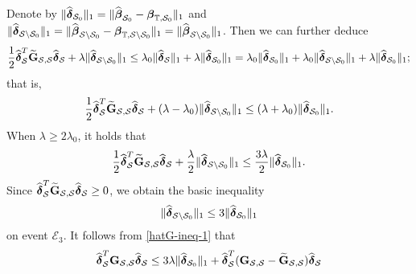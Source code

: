 \documentclass[11pt]{article}
\newcommand{\bG}{\mbox{\bf G}}
\newcommand{\bbeta}{\mbox{\boldmath $\beta$}}
\newcommand{\bdelta}{\mbox{\boldmath $\delta$}}
\begin{document}
Denote by  $\|\widehat{\bdelta}_{\mathcal{S}_0}\|_1=\|\widehat{\bbeta}_{\mathcal{S}_0}-\bbeta_{\mathbb{T}, \mathcal{S}_0}\|_1$ and $\|\widehat{\bdelta}_{\mathcal{S}\setminus\mathcal{S}_0}\|_1=\|\widehat{\bbeta}_{\mathcal{S}\setminus \mathcal{S}_0}-\bbeta_{\mathbb{T}, \mathcal{S}\setminus\mathcal{S}_0}\|_1=\|\widehat{\bbeta}_{\mathcal{S}\setminus\mathcal{S}_0}\|_1$. Then we can further deduce
		\begin{eqnarray*}
			\dfrac{1}{2}\widehat{\bdelta}_\mathcal{S}^T\widetilde{\bG}_{\mathcal{S},\mathcal{S}}\widehat{\bdelta}_\mathcal{S}+\lambda\|\widehat{\bdelta}_{\mathcal{S}\setminus\mathcal{S}_0}\|_1\le \lambda_{0}\|\widehat{\bdelta}_\mathcal{S}\|_1+\lambda\|\widehat{\bdelta}_{\mathcal{S}_0}\|_1=\lambda_{0}\|\widehat{\bdelta}_{\mathcal{S}_0}\|_1+\lambda_{0}\|\widehat{\bdelta}_{\mathcal{S}\setminus\mathcal{S}_0}\|_1+\lambda\|\widehat{\bdelta}_{\mathcal{S}_0}\|_1;
		\end{eqnarray*}
		that is,
		\begin{eqnarray}\label{hatG-ineq}
		\dfrac{1}{2}\widehat{\bdelta}_\mathcal{S}^T\widetilde{\bG}_{\mathcal{S},\mathcal{S}}\widehat{\bdelta}_\mathcal{S}+(\lambda-\lambda_{0})\|\widehat{\bdelta}_{\mathcal{S}\setminus\mathcal{S}_0}\|_1 \le (\lambda+\lambda_{0})\|\widehat{\bdelta}_{\mathcal{S}_0}\|_1.
		\end{eqnarray}
		When $\lambda\geq 2\lambda_{0}$, it holds that
		\begin{eqnarray}\label{hatG-ineq-1}
		\dfrac{1}{2}\widehat{\bdelta}_\mathcal{S}^T\widetilde{\bG}_{\mathcal{S},\mathcal{S}}\widehat{\bdelta}_{\mathcal{S}}+\dfrac{\lambda}{2}\|\widehat{\bdelta}_{\mathcal{S}\setminus\mathcal{S}_0}\|_1 \le \dfrac{3\lambda}{2}\|\widehat{\bdelta}_{\mathcal{S}_0}\|_1.
		\end{eqnarray}
		Since  $\widehat{\bdelta}_\mathcal{S}^T\widetilde{\bG}_{\mathcal{S},\mathcal{S}}\widehat{\bdelta}_{\mathcal{S}}\geq0$,  we obtain the basic inequality
		\begin{align}\label{eq: e047}
		\|\widehat{\bdelta}_{\mathcal{S}\setminus\mathcal{S}_0}\|_1 \le 3\|\widehat{\bdelta}_{\mathcal{S}_0}\|_1
		\end{align}
		on event $\mathcal{E}_3$.
		It follows from \eqref{hatG-ineq-1} that
		\begin{eqnarray}\label{hatG-tildeG}
		\widehat{\bdelta}_\mathcal{S}^T{\bG}_{\mathcal{S},\mathcal{S}}\widehat{\bdelta}_\mathcal{S}
		\le 3\lambda\|\widehat{\bdelta}_{\mathcal{S}_0}\|_1+\widehat{\bdelta}_\mathcal{S}^T({\bG}_{\mathcal{S},\mathcal{S}}-\widetilde{\bG}_{\mathcal{S},\mathcal{S}})\widehat{\bdelta}_{\mathcal{S}}
		\end{eqnarray}
\end{document}
